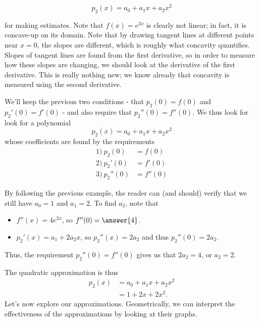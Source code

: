 \documentclass{ximera}
\begin{document}
\[
p_2(x) = a_0+a_1x+a_2x^2
\]

for making estimates.  Note that $f(x)=e^{2x}$ is clearly not linear;
in fact, it is concave-up
on its domain.  Note that by drawing tangent lines at different points
near $x=0$, the slopes are different, which is roughly what concavity
quantifies.  Slopes of tangent lines are found from the first
derivative, so in order to measure how these slopes are changing, we
should look at the derivative of the first derivative.  This is really
nothing new; we know already that concavity is measured using the
second derivative.

We'll keep the previous two conditions - that $p_2(0) = f(0)$ and $p_2'(0) = f'(0)$ - and also require that $p_2''(0) = f''(0)$.  We thus look for look for a polynomial
\[p_2(x) = a_0+a_1x+a_2x^2
\]
whose coefficients are found by the requirements
\begin{align*}
1) ~ p_2(0) & = f(0) \\
2) ~ p_2'(0) & = f'(0) \\
3) ~ p_2''(0) & = f''(0)
\end{align*}

By following the previous example, the reader can (and should) verify that we still have $a_0=1$ and $a_1=2$.  To find $a_2$, note that

\begin{itemize}
\item $f''(x) = 4e^{2x}$, so $f''(0) = \answer{4}$.
\item $p_2'(x) = a_1+2a_2x$, so $p_2''(x) = 2a_2$ and thus $p_2''(0) = 2 a_2$.
\end{itemize}
Thus, the requirement $p_2''(0) =f''(0)$ gives us that $2a_2=4$, or $a_2=2$.

The quadratic approximation is thus 
\begin{align*}
p_2(x) &= a_0+a_1x+a_2x^2 \\
&= 1+2x+2x^2.
\end{align*}
Let's now explore our approximations.  Geometrically, we can interpret the effectiveness of the approximations by looking at their graphs.

\begin{image}
\end{image}
\end{document}
